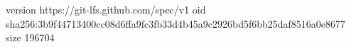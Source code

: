 version https://git-lfs.github.com/spec/v1
oid sha256:3b9f44713400cc08d6ffa9fc3fb33d4b45a9c2926bd5f6bb25daf8516a0e8677
size 196704
